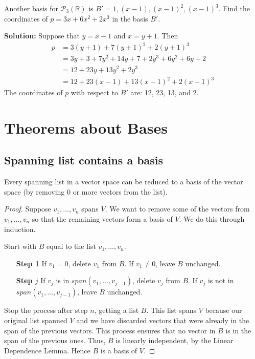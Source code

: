 \documentclass[11pt]{article}
\begin{document}
    \vspace{1em}

    Another basis for \(\mathcal{P}_3(\mathbb{R})\) is \(B' = 1, (x-1), (x-1)^2, (x-1)^3\). Find the coordinates of \(p = 3x + 6x^2 + 2x^3\) in the basis $B'$.

    \vspace{1em}

    \textbf{Solution:} Suppose that \(y = x - 1\) and \(x = y + 1\). Then 
    \begin{align*}
        p &= 3(y+1) + 7(y + 1)^2 + 2(y+1)^3 \\
          &= 3y + 3 + 7y^2 + 14y + 7 + 2y^3 + 6y^2 + 6y + 2 \\
          &= 12 + 23y + 13 y^2 + 2y^3 \\
          &= 12 + 23(x-1) + 13(x-1)^2 + 2(x-1)^3
    \end{align*}
    The coordinates of $p$ with respect to $B'$ are: 12, 23, 13, and 2.

    \section{Theorems about Bases}

    \subsection{Spanning list contains a basis}

    Every spanning list in a vector space can be reduced to a basis of the vector space (by removing 0 or more vectors from the list).

    \begin{proof}
        Suppose \(v_1, \dots, v_n\) spans $V$. We want to remove some of the vectors from \( v_1, \dots, v_n \) so that the remaining vectors form a basis of $V$. We do this through induction.

        Start with $B$ equal to the list \(v_1, \dots, v_n.\)

        \begin{enumerate}
            \item[\textbf{Step 1}] If \(v_1 = 0\), delete \(v_1\) from $B$. If \(v_1 \neq 0\), leave $B$ unchanged.
            \item[\textbf{Step $j$}] If \(v_j\) is in \(span(v_1, \dots, v_{j-1})\), delete \(v_j\) from $B$. If \(v_j\) is not in \(span(v_1, \dots, v_{j-1})\), leave $B$ unchanged.  
        \end{enumerate}

        Stop the process after step $n$, getting a list $B$. This list spans $V$ because our original list spanned $V$ and we have discarded vectors that were already in the span of the previous vectors. This process ensures that no vector in $B$ is in the span of the previous ones. Thus, $B$ is linearly independent, by the Linear Dependence Lemma. Hence $B$ is a basis of $V$.
    \end{proof}
\end{document}
